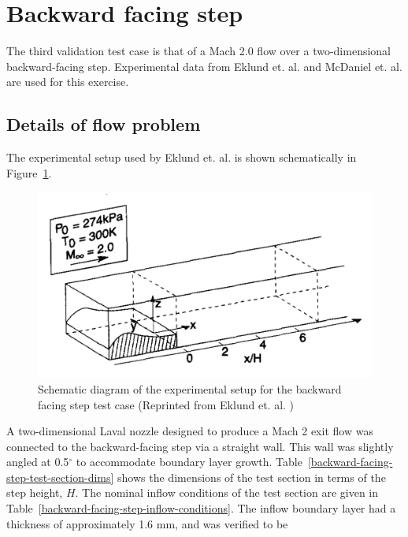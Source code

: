 %
\newpage
\section{Backward facing step}
%
The third validation test case is that of a Mach 2.0 flow over a
two-dimensional backward-facing step. Experimental data from Eklund et. al. \cite{Eklund1995}
and McDaniel et. al. \cite{McDaniel1991} are  used for this exercise.

\subsection{Details of flow problem}
%
The experimental setup used by Eklund et. al. is shown 
schematically in Figure~\ref{backward-facing-step-exp-setup-fig}.
%
\begin{figure}[htbp]
\begin{center}
\includegraphics[width=12cm]{./chap4-backward-facing-step/figs/experimental-setup.png}
\end{center}
\caption{Schematic diagram of the experimental setup for the backward
         facing step test case (Reprinted from Eklund et. al. \cite{Eklund1995})}
\label{backward-facing-step-exp-setup-fig}
\end{figure}
%
A two-dimensional Laval nozzle designed to produce a Mach 2 exit flow was 
connected to the backward-facing step via a straight wall. This wall was
slightly angled at 0.5$^{\circ}$ to accommodate boundary layer growth. 
Table~\ref{backward-facing-step-test-section-dims} shows the 
dimensions of the test section in terms of the step height, $H$. The 
nominal inflow conditions of the test section are given in
Table~\ref{backward-facing-step-inflow-conditions}. The inflow boundary 
layer had a thickness of approximately 1.6 mm, and was verified to be 
